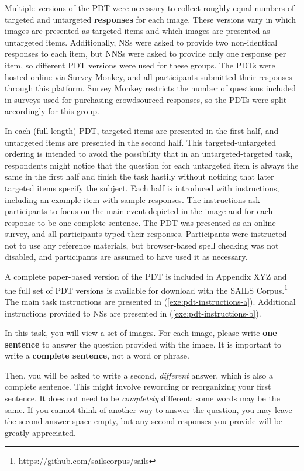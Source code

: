 Multiple versions of the PDT were necessary to collect roughly equal numbers of targeted and untargeted \textbf{responses} for each image. These versions vary in which images are presented as targeted items and which images are presented as untargeted items. Additionally, NSs were asked to provide two non-identical responses to each item, but NNSs were asked to provide only one response per item, so different PDT versions were used for these groups. The PDTs were hosted online via Survey Monkey, and all participants submitted their responses through this platform. Survey Monkey restricts the number of questions included in surveys used for purchasing crowdsourced responses, so the PDTs were split accordingly for this group.

In each (full-length) PDT, targeted items are presented in the first half, and untargeted items are presented in the second half. This targeted-untargeted ordering is intended to avoid the possibility that in an untargeted-targeted task, respondents might notice that the question for each untargeted item is always the same in the first half and finish the task hastily without noticing that later targeted items specify the subject. Each half is introduced with instructions, including an example item with sample responses. The instructions ask participants to focus on the main event depicted in the image and for each response to be one complete sentence. The PDT was presented as an online survey, and all participants typed their responses. Participants were instructed not to use any reference materials, but browser-based spell checking was not disabled, and participants are assumed to have used it as necessary.

A complete paper-based version of the PDT is included in Appendix XYZ  and the full set of PDT versions is available for download with the SAILS Corpus.\footnote{https://github.com/sailscorpus/sails} The main task instructions are presented in (\ref{exe:pdt-instructions-a}). Additional instructions provided to NSs are presented in (\ref{exe:pdt-instructions-b}).

\begin{exe}
  \ex\label{exe:pdt-instructions-a}In this task, you will view a set of images. For each image, please write \textbf{one sentence} to answer the question provided with the image. It is important to write a \textbf{complete sentence}, not a word or phrase.
\end{exe}

\begin{exe}
  \ex\label{exe:pdt-instructions-b}Then, you will be asked to write a second, \textit{different} answer, which is also a complete sentence. This might involve rewording or reorganizing your first sentence. It does not need to be \textit{completely} different; some words may be the same. If you cannot think of another way to answer the question, you may leave the second answer space empty, but any second responses you provide will be greatly appreciated.
\end{exe}

